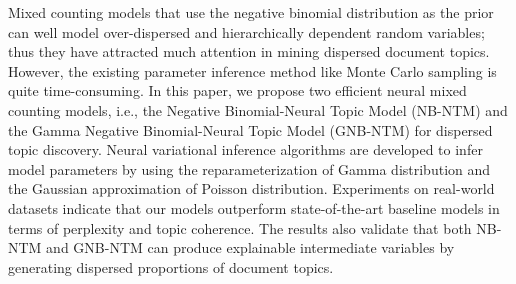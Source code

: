 Mixed counting models that use the negative binomial distribution as the prior can well model over-dispersed and hierarchically dependent random variables; thus they have attracted much attention in mining dispersed document topics. However, the existing parameter inference method like Monte Carlo sampling is quite time-consuming. In this paper, we propose two efficient neural mixed counting models, i.e., the Negative Binomial-Neural Topic Model (NB-NTM) and the Gamma Negative Binomial-Neural Topic Model (GNB-NTM) for dispersed topic discovery. Neural variational inference algorithms are developed to infer model parameters by using the reparameterization of Gamma distribution and the Gaussian approximation of Poisson distribution. Experiments on real-world datasets indicate that our models outperform state-of-the-art baseline models in terms of perplexity and topic coherence. The results also validate that both NB-NTM and GNB-NTM can produce explainable intermediate variables by generating dispersed proportions of document topics.
